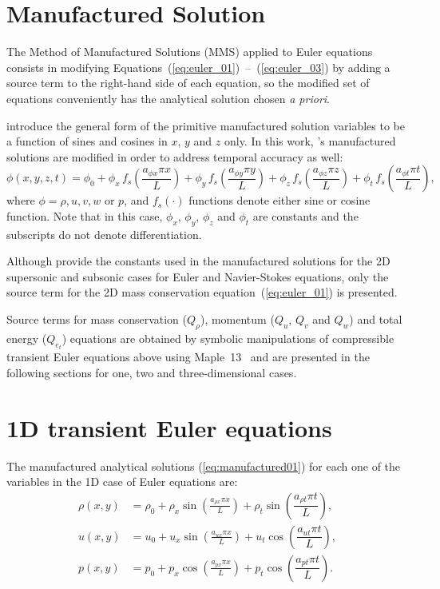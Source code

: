 \documentclass[10pt]{article}
\begin{document}
\section{Manufactured Solution}

The Method of Manufactured Solutions (MMS) applied to Euler equations consists in modifying Equations~(\ref{eq:euler_01})~--~(\ref{eq:euler_03}) by adding a source term to the right-hand side of each equation, so the modified set of equations conveniently has the analytical solution chosen \textit{a priori}.

\citet{Roy2002} introduce the general form of the primitive manufactured solution variables to be  a function of sines and cosines in $x$, $y$ and $z$ only. In this work, \citet{Roy2002}'s manufactured solutions are modified in order to address temporal accuracy as well:
\begin{equation}
 \label{eq:manufactured01}
  \phi (x,y,z,t) = \phi_0+ \phi_x\, f_s \left(\frac{a_{\phi x} \pi x}{L} \right) +  \phi_y \,f_s\left(\frac{a_{\phi y} \pi y}{L}\right) + \phi_z \,f_s\left(\frac{a_{\phi z} \pi z}{L}\right)+ \phi_t \,f_s\left(\frac{a_{\phi t} \pi t}{L}\right),
\end{equation}
where $\phi=\rho,u,v,w$ or $p$, and $f_s(\cdot)$ functions denote either sine or cosine function. Note that in this case, $\phi_x$, $\phi_y$, $\phi_z$  and $\phi_t$ are constants  and the subscripts do not denote differentiation.


Although \citet{Roy2002} provide the constants used in the manufactured solutions for the 2D supersonic and subsonic cases for Euler and Navier-Stokes equations, only the source term for the 2D mass conservation equation~(\ref{eq:euler_01}) is presented.


Source terms  for mass conservation ($Q_\rho$), momentum ($Q_u$, $Q_v$ and $Q_w$)  and total energy ($Q_{e_t}$) equations are obtained by symbolic manipulations of compressible transient Euler equations above using Maple~13~\citep{Maple} and are presented in the following sections for  one, two and three-dimensional cases.




\section{1D transient Euler equations}

The manufactured analytical solutions (\ref{eq:manufactured01}) for each one of the variables in the 1D case of Euler equations are:
\begin{equation}
\begin{split}
\label{eq:manufactured_1d}
\rho\left(x,y\right) &=  \rho_{0}+ \rho_{x} \sin\left(\frac{a_{ \rho x} \pi x}{L}\right)+ \rho_t \sin\left(\dfrac{a_{\rho t} \pi t}{L}\right),\\
u\left(x,y\right) &= u_{0}+u_{x} \sin\left(\frac{a_{u x} \pi x}{L}\right) + u_t \cos\left(\dfrac{a_{u t} \pi t}{L}\right),\\
p\left(x,y\right) &= p_{0}+p_{x} \cos\left(\frac{a_{p x} \pi x}{L}\right)+ p_t \cos\left(\dfrac{a_{p t} \pi t}{L}\right).\\
\end{split}
\end{equation}
\end{document}
